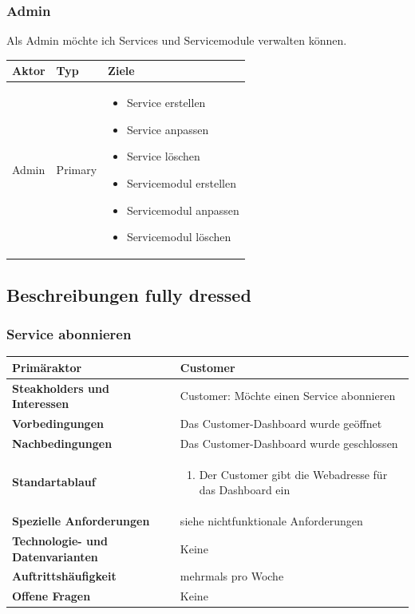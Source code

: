 \documentclass[11pt]{scrartcl}
\begin{document}
\subsubsection{Admin}
Als Admin möchte ich Services und Servicemodule verwalten können.
\\
\begin{tabularx}{\linewidth}{l l X }
  \textbf{Aktor} & \textbf{Typ} & \textbf{Ziele}\\
  \hline
  Admin & Primary & 
  \begin{minipage}{5in}
  \vskip 4pt
  \begin{itemize}
    \item Service erstellen
    \item Service anpassen
    \item Service löschen
    \item Servicemodul erstellen
    \item Servicemodul anpassen
    \item Servicemodul löschen
  \end{itemize}
  \vskip 4pt
 \end{minipage}\\
 \hline
\end{tabularx}


\subsection{Beschreibungen fully dressed}
\subsubsection{Service abonnieren}
\begin{longtabu} to \textwidth {X[1,l] X[2,l]}
	\bfseries Primäraktor & Customer  \\\hline 
	\bfseries Steakholders und Interessen & Customer: Möchte einen Service abonnieren  \\\hline 
	\bfseries Vorbedingungen & Das Customer-Dashboard wurde geöffnet  \\\hline 
	\bfseries Nachbedingungen & Das Customer-Dashboard wurde geschlossen  \\\hline 
	\bfseries Standartablauf & 
		\begin{enumerate}
			\item Der Customer gibt die Webadresse für das Dashboard ein
			
		\end{enumerate}
      \\\hline
	\bfseries Spezielle Anforderungen & siehe nichtfunktionale Anforderungen  \\\hline 
	\bfseries Technologie- und Datenvarianten & Keine  \\\hline 
	\bfseries Auftrittshäufigkeit & mehrmals pro Woche  \\\hline 
	\bfseries Offene Fragen & Keine  \\\hline  
\end{longtabu}
\end{document}
